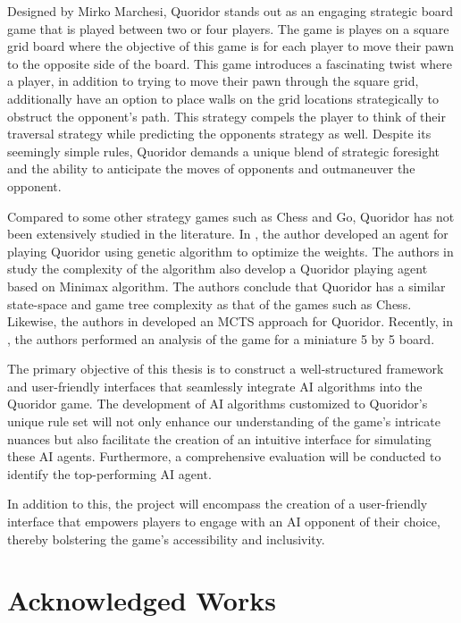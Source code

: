 Designed by Mirko Marchesi, Quoridor stands out as an engaging strategic board game that is played between two or four players. The game is playes on a square grid board where the objective of this game is for each player to move their pawn to the opposite side of the board. This game introduces a fascinating twist where a player, in addition to trying to move their pawn through the square grid, additionally have an option to place walls on the grid locations strategically to obstruct the opponent's path. This strategy compels the player to think of their traversal strategy while predicting the opponents strategy as well. Despite its
seemingly simple rules, Quoridor demands a unique blend of strategic foresight and the ability to anticipate the moves of opponents and outmaneuver the opponent.

Compared to some other strategy games such as Chess and Go, Quoridor has not been extensively studied in the literature. In \cite{Glendenning2002MasteringQ}, the author developed an agent for playing Quoridor using genetic algorithm to optimize the weights. The authors in \cite{Mertens2006Quoridor} study the complexity of the algorithm also develop a Quoridor playing agent based on Minimax algorithm. The authors conclude that Quoridor has a similar state-space and game tree complexity as that of the games such as Chess. Likewise, the authors in \cite{Brenner2015Artificial} developed an \ac{MCTS} approach for Quoridor. Recently, in \cite{Iwanaga2022Analysis}, the authors performed an analysis of the game for a miniature 5 by 5 board.

The primary objective of this thesis is to construct a well-structured framework and user-friendly interfaces
that seamlessly integrate AI algorithms into the Quoridor game. The development of AI algorithms customized to
Quoridor's unique rule set will not only enhance our understanding of the game's intricate nuances but also
facilitate the creation of an intuitive interface for simulating these AI agents. Furthermore, a comprehensive
evaluation will be conducted to identify the top-performing AI agent.

In addition to this, the project will encompass the creation of a user-friendly interface that empowers players
to engage with an AI opponent of their choice, thereby bolstering the game's accessibility and inclusivity.

\section {Acknowledged Works}

